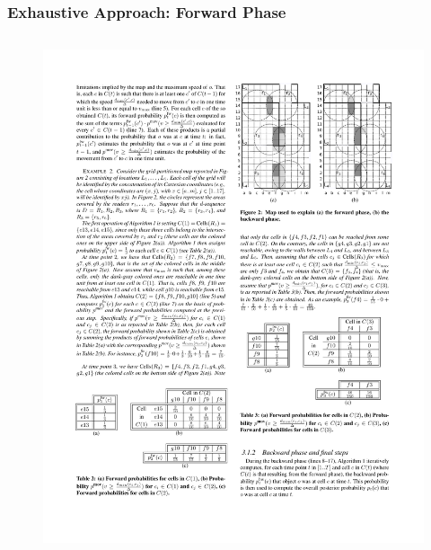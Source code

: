 \begin{frame}
\frametitle{Exhaustive Approach: Forward Phase}

\begin{columns}

\begin{figure}[tb]
  \includegraphics[width=\columnwidth]{figures/3-4/3-4-17.pdf}
\end{figure}


\end{columns}
\end{frame}
